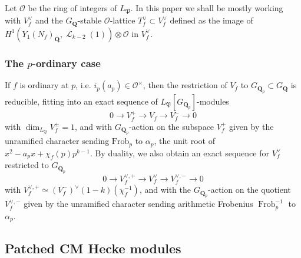 \documentclass[10pt,letterpaper]{amsart}
\theoremstyle{plain}
\theoremstyle{definition}
\theoremstyle{definition}
\theoremstyle{plain}
\theoremstyle{plain}
\theoremstyle{plain}
\theoremstyle{remark}
\numberwithin{equation}{section}
\DeclareMathOperator{\et}{\acute{e}t}
\DeclareMathOperator{\Ll}{\mathscr{L}}
\DeclareMathOperator{\Frob}{\mathrm{Frob}}
\def\cO{\mathcal O}
\newcommand{\Q}{\mathbf{Q}}
\begin{document}
Let $\cO$ be the ring of integers of $L_\mathfrak{P}$. In this paper we shall be mostly working with $V_f^\vee$ and the $G_{\Q}$-stable $\cO$-lattice $T_f^\vee\subset V_f^\vee$ defined as the image of 
$H^1_{\et}(Y_1(N_f)_{\overline{\Q}},\Ll_{k-2}(1))\otimes\cO$ in $V_f^\vee$.


\subsubsection{The $p$-ordinary case}\label{subsec:p-ord}

If $f$ is ordinary at $p$, i.e. $i_p(a_p)\in\cO^\times$, then the restriction of $V_f$ to $G_{\Q_p}\subset G_{\Q}$ is reducible, fitting into an exact sequence of $L_{\mathfrak{P}}[G_{\Q_p}]$-modules
\begin{equation*}
0\rightarrow V_f^{+}\rightarrow V_f\rightarrow V_f^{-}\rightarrow 0 
\end{equation*}
with $\dim_{L_\mathfrak{P}}V_f^{\pm}=1$, and with $G_{\Q_p}$-action on the subspace $V_f^+$ 
given by the unramified character sending  $\mathrm{Frob}_p$ to $\alpha_p$, the unit root of $x^2-a_px+\chi_f(p)p^{k-1}$. 
%    
By duality, we also obtain an exact sequence for $V_f^{\vee}$ restricted to $G_{\Q_p}$
\begin{equation}
0\rightarrow V_f^{\vee,+}\rightarrow V_f^{\vee}\rightarrow V_f^{\vee,-}\rightarrow 0 
\end{equation}
with $V_f^{\vee,+}\simeq(V_f^-)^\vee(1-k)(\chi_f^{-1})$, and with the $G_{\Q_p}$-action on the quotient $V_{f}^{\vee,-}$ given by the unramified character sending arithmetic Frobenius $\Frob_p^{-1}$ to $\alpha_p$.
%    
 





\subsection{Patched CM Hecke modules}\label{LLZ-K}
\end{document}
